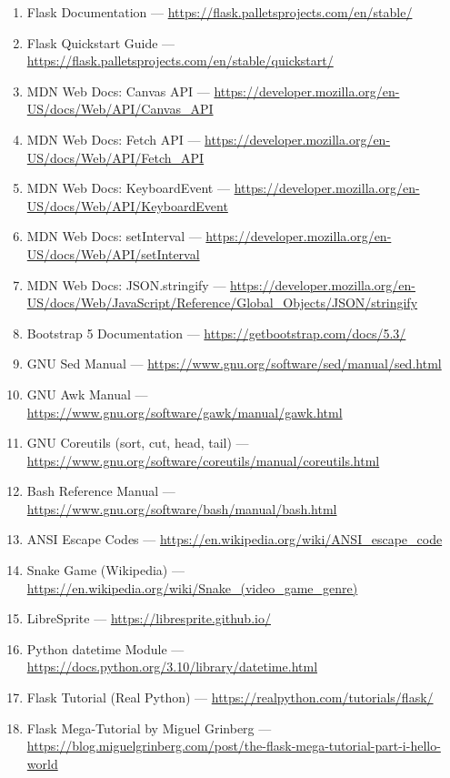 \documentclass[12pt,a4paper]{article}
\begin{document}
\begin{enumerate}
    \item Flask Documentation --- \url{https://flask.palletsprojects.com/en/stable/} \cite{flask_docs}
    \item Flask Quickstart Guide --- \url{https://flask.palletsprojects.com/en/stable/quickstart/} \cite{flask_quickstart}
    \item MDN Web Docs: Canvas API --- \url{https://developer.mozilla.org/en-US/docs/Web/API/Canvas_API} \cite{mdn_canvas}
    \item MDN Web Docs: Fetch API --- \url{https://developer.mozilla.org/en-US/docs/Web/API/Fetch_API} \cite{mdn_fetch}
    \item MDN Web Docs: KeyboardEvent --- \url{https://developer.mozilla.org/en-US/docs/Web/API/KeyboardEvent} \cite{mdn_keyboard}
    \item MDN Web Docs: setInterval --- \url{https://developer.mozilla.org/en-US/docs/Web/API/setInterval} \cite{mdn_setinterval}
    \item MDN Web Docs: JSON.stringify --- \url{https://developer.mozilla.org/en-US/docs/Web/JavaScript/Reference/Global_Objects/JSON/stringify} \cite{mdn_json_stringify}
    \item Bootstrap 5 Documentation --- \url{https://getbootstrap.com/docs/5.3/} \cite{bootstrap_docs}
    \item GNU Sed Manual --- \url{https://www.gnu.org/software/sed/manual/sed.html} \cite{gnu_sed}
    \item GNU Awk Manual --- \url{https://www.gnu.org/software/gawk/manual/gawk.html} \cite{gnu_awk}
    \item GNU Coreutils (sort, cut, head, tail) --- \url{https://www.gnu.org/software/coreutils/manual/coreutils.html} \cite{gnu_coreutils}
    \item Bash Reference Manual --- \url{https://www.gnu.org/software/bash/manual/bash.html} \cite{bash_manual}
    \item ANSI Escape Codes --- \url{https://en.wikipedia.org/wiki/ANSI_escape_code} \cite{ansi_escape}
    \item Snake Game (Wikipedia) --- \url{https://en.wikipedia.org/wiki/Snake_(video_game_genre)} \cite{snake_wikipedia}
    \item LibreSprite --- \url{https://libresprite.github.io/} \cite{libresprite}
    \item Python datetime Module --- \url{https://docs.python.org/3.10/library/datetime.html} \cite{python_datetime}
    \item Flask Tutorial (Real Python) --- \url{https://realpython.com/tutorials/flask/} \cite{realpython_flask}
    \item Flask Mega-Tutorial by Miguel Grinberg --- \url{https://blog.miguelgrinberg.com/post/the-flask-mega-tutorial-part-i-hello-world} \cite{grinberg_flask}
\end{enumerate}



\end{document}
